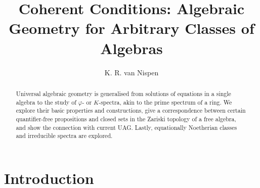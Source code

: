 \documentclass{article}
\title{Coherent Conditions: Algebraic Geometry for Arbitrary Classes of Algebras}
\author{K. R. van Nispen}
\theoremstyle{plain}
\theoremstyle{definition}
\begin{document}
\maketitle


\begin{abstract}
    Universal algebraic geometry is generalised from solutions of equations in a single algebra to the study of $\varphi$- or $K$-spectra, akin to the prime spectrum of a ring.
    We explore their basic properties and constructions, give a correspondence between certain quantifier-free propositions and closed sets in the Zariski topology of a free algebra, and show the connection with current UAG.
    Lastly, equationally Noetherian classes and irreducible spectra are explored.
\end{abstract}


\tableofcontents

\pagebreak


\section*{Introduction}
\end{document}
